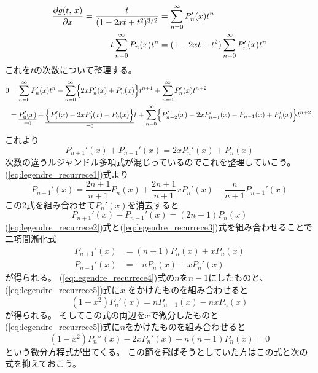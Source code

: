 \documentclass[../../master.tex]{subfiles}
\begin{document}
\begin{align}
	\pdv{g(t,\,x)}{x} = \frac{t}{(1-2xt+t^2)^{3/2}} & = \sum_{n=0}^{\infty} P_n'(x) t^n            \\
	t\sum_{n=0}^{\infty} P_n(x) t^n                 & = (1-2xt+t^2)\sum_{n=0}^{\infty} P_n'(x) t^n
\end{align}
これを\(t\)の次数について整理する。
\begin{equation}\begin{aligned}[b]
    0 & = \sum_{n=0}^{\infty} P_n'(x)t^n - \sum_{n=0}^{\infty} \Bigl\{2xP_n'(x)+P_n(x)\Bigr\}t^{n+1} + \sum_{n=0}^{\infty}P_n'(x) t^{n+2} \\
	  & = \underset{=0}{\underline{P_0'(x)}}
	+\underset{=0}{\underline{\Bigl\{P_1'(x)-2xP_0'(x)-P_0(x)\Bigr\}}}t
	+\sum_{n=0}^{\infty}\Bigl\{P_{n-2}'(x)-2xP_{n-1}'(x)-P_{n-1}(x) +P_n'(x) \Bigr\}t^{n+2}.
\end{aligned}\end{equation}
これより
\begin{equation}
	P_{n+1}'(x)+P_{n-1}'(x) = 2xP_n'(x) + P_n(x) \label{eq:legendre_recurrece2}
\end{equation}
次数の違うルジャンドル多項式が混じっているのでこれを整理していこう。
(\ref{eq:legendre_recurrece1})式より
\begin{equation}
	P_{n+1}'(x) = \frac{2n+1}{n+1}P_n(x)+\frac{2n+1}{n+1}xP_n'(x) - \frac{n}{n+1}P_{n-1}'(x)
\end{equation}
この2式を組み合わせて\(P_n'(x)\)を消去すると
\begin{equation}
	P_{n+1}'(x)-P_{n-1}'(x) = (2n+1) P_n(x) \label{eq:legendre_recurrece3}
\end{equation}
(\ref{eq:legendre_recurrece2})式と(\ref{eq:legendre_recurrece3})式を組み合わせることで
二項間漸化式
\begin{align}
	P_{n+1}'(x) & = (n+1)P_n(x) + xP_n(x)\label{eq:legendre_recurrece4} \\
	P_{n-1}'(x) & = -nP_n(x)+xP_n'(x)\label{eq:legendre_recurrece5}
\end{align}
が得られる。
(\ref{eq:legendre_recurrece4})式の\(n\)を\(n-1\)にしたものと、
(\ref{eq:legendre_recurrece5})式に\(x\) をかけたものを組み合わせると
\begin{equation}
	(1-x^2)P_n'(x)= nP_{n-1}(x)-nxP_n(x)
\end{equation}
が得られる。
そしてこの式の両辺を\(x\)で微分したものと
(\ref{eq:legendre_recurrece5})式に\(n\)をかけたものを組み合わせると
\begin{equation}
	(1-x^2)P_n''(x)-2xP_n'(x)+n(n+1)P_n(x) = 0 \label{eq:legendre_dif_eq1}
\end{equation}
という微分方程式が出てくる。
この節を飛ばそうとしていた方はこの式と次の式を抑えておこう。
\end{document}
